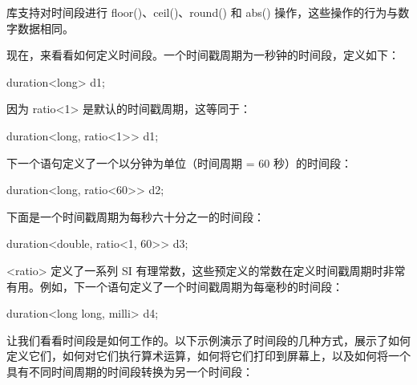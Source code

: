 库支持对时间段进行 floor()、ceil()、round() 和 abs() 操作，这些操作的行为与数字数据相同。

现在，来看看如何定义时间段。一个时间戳周期为一秒钟的时间段，定义如下：

\begin{cpp}
duration<long> d1;
\end{cpp}

因为 ratio<1> 是默认的时间戳周期，这等同于：

\begin{cpp}
duration<long, ratio<1>> d1;
\end{cpp}

下一个语句定义了一个以分钟为单位（时间周期 = 60 秒）的时间段：

\begin{cpp}
duration<long, ratio<60>> d2;
\end{cpp}

下面是一个时间戳周期为每秒六十分之一的时间段：

\begin{cpp}
duration<double, ratio<1, 60>> d3;
\end{cpp}

<ratio> 定义了一系列 SI 有理常数，这些预定义的常数在定义时间戳周期时非常有用。例如，下一个语句定义了一个时间戳周期为每毫秒的时间段：

\begin{cpp}
duration<long long, milli> d4;
\end{cpp}


让我们看看时间段是如何工作的。以下示例演示了时间段的几种方式，展示了如何定义它们，如何对它们执行算术运算，如何将它们打印到屏幕上，以及如何将一个具有不同时间周期的时间段转换为另一个时间段：


